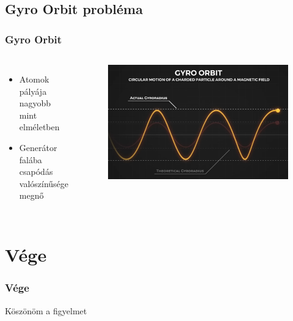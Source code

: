 \documentclass{beamer}
\begin{document}
\subsection{Gyro Orbit probléma}
\begin{frame}
    \frametitle{Gyro Orbit}
    \begin{columns}
        \footnotesize
        \begin{itemize}
            \item Atomok pályája nagyobb mint elméletben
            \item Generátor falába csapódás valószínűsége megnő
        \end{itemize}
        \begin{figure}
            \includegraphics[scale=0.17]{gyro_orbit.png}
        \end{figure}    
    \end{columns}
    
\end{frame}

\section{Vége}
\begin{frame}
    \frametitle{Vége}
    \centering
    \Huge Köszönöm a figyelmet
\end{frame}
\end{document}
